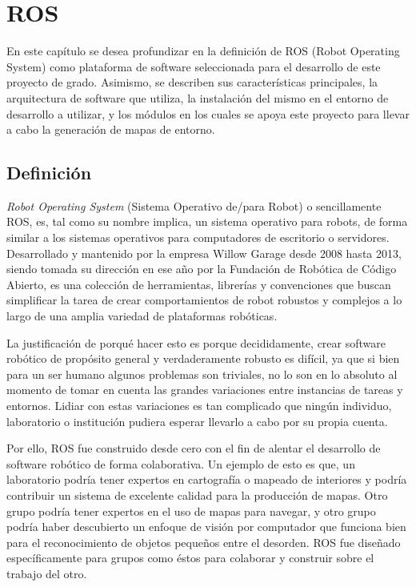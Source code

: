 \chapter{ROS}

En este capítulo se desea profundizar en la definición de ROS (Robot Operating System) como plataforma de software seleccionada para el desarrollo de este proyecto de grado. Asimismo, se describen sus características principales, la arquitectura de software que utiliza, la instalación del mismo en el entorno de desarrollo a utilizar, y los módulos en los cuales se apoya este proyecto para llevar a cabo la generación de mapas de entorno.

\section{Definición}

\textit{Robot Operating System} (Sistema Operativo de/para Robot) o sencillamente ROS, es, tal como su nombre implica, un sistema operativo para robots, de forma similar a los sistemas operativos para computadores de escritorio o servidores. Desarrollado y mantenido por la empresa Willow Garage desde 2008 hasta 2013, siendo tomada su dirección en ese año por la Fundación de Robótica de Código Abierto, es una colección de herramientas, librerías y convenciones que buscan simplificar la tarea de crear comportamientos de robot robustos y complejos a lo largo de una amplia variedad de plataformas robóticas.

La justificación de porqué hacer esto es porque decididamente, crear software robótico de propósito general y verdaderamente robusto es difícil, ya que si bien para un ser humano algunos problemas son triviales, no lo son en lo absoluto al momento de tomar en cuenta las grandes variaciones entre instancias de tareas y entornos. Lidiar con estas variaciones es tan complicado que ningún individuo, laboratorio o institución pudiera esperar llevarlo a cabo por su propia cuenta.

Por ello, ROS fue construido desde cero con el fin de alentar el desarrollo de software robótico de forma colaborativa. Un ejemplo de esto es que, un laboratorio podría tener expertos en cartografía o mapeado de interiores y podría contribuir un sistema de excelente calidad para la producción de mapas. Otro grupo podría tener expertos en el uso de mapas para navegar, y otro grupo podría haber descubierto un enfoque de visión por computador que funciona bien para el reconocimiento de objetos pequeños entre el desorden. ROS fue diseñado específicamente para grupos como éstos para colaborar y construir sobre el trabajo del otro. \cite{aboutros}

